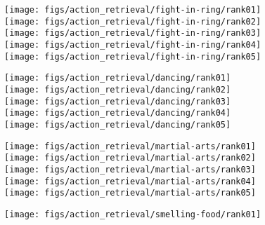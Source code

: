 \begin{figure*}[t]
\begin{minipage}{1\linewidth}
\begin{minipage}{0.19\linewidth}
\texttt{[image: figs/action\_retrieval/fight-in-ring/rank01]}  \\
\texttt{[image: figs/action\_retrieval/fight-in-ring/rank02]}  \\
\texttt{[image: figs/action\_retrieval/fight-in-ring/rank03]}  \\
\texttt{[image: figs/action\_retrieval/fight-in-ring/rank04]}  \\
\texttt{[image: figs/action\_retrieval/fight-in-ring/rank05]}
\end{minipage}
\hfill
\begin{minipage}{0.19\linewidth}
\texttt{[image: figs/action\_retrieval/dancing/rank01]}  \\
\texttt{[image: figs/action\_retrieval/dancing/rank02]}  \\
\texttt{[image: figs/action\_retrieval/dancing/rank03]}  \\
\texttt{[image: figs/action\_retrieval/dancing/rank04]}  \\
\texttt{[image: figs/action\_retrieval/dancing/rank05]}
\end{minipage}
\hfill
\begin{minipage}{0.19\linewidth}
\texttt{[image: figs/action\_retrieval/martial-arts/rank01]}  \\
\texttt{[image: figs/action\_retrieval/martial-arts/rank02]}  \\
\texttt{[image: figs/action\_retrieval/martial-arts/rank03]}  \\
\texttt{[image: figs/action\_retrieval/martial-arts/rank04]}  \\
\texttt{[image: figs/action\_retrieval/martial-arts/rank05]}
\end{minipage}
\hfill
\begin{minipage}{0.19\linewidth}
\texttt{[image: figs/action\_retrieval/smelling-food/rank01]}          \\

\end{minipage}
\end{minipage}
\end{figure*}
